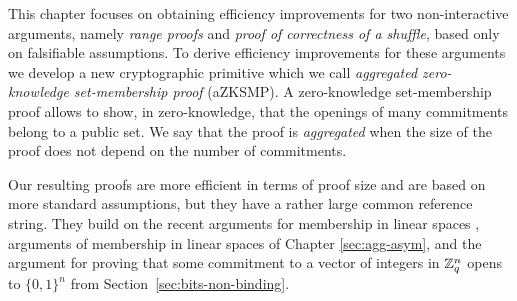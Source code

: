This chapter focuses on obtaining efficiency improvements for two non-interactive arguments, namely \emph{range proofs} and \emph{proof of correctness of a shuffle}, based only on falsifiable assumptions.  To derive efficiency improvements for these arguments we develop a new cryptographic primitive which we call \emph{aggregated zero-knowledge set-membership proof} (aZKSMP). A zero-knowledge set-membership proof allows to show, in zero-knowledge, that the openings of many commitments belong to a public set. We say that the proof is \emph{aggregated} when the size of the proof does not depend on the number of commitments.

Our resulting proofs are more efficient in terms of proof size and are based on more standard assumptions, but they have a rather large common reference string. They build on the recent arguments for membership in linear spaces \cite{EC:LPJY14,C:JutRoy14,EC:KilWee15}, arguments of membership in linear spaces of Chapter \ref{sec:agg-asym}, and the argument for proving that some commitment to a vector of integers in $\mathbb{Z}_q^{n}$ opens to $\{0,1\}^n$ from Section~\ref{sec:bits-non-binding}.
 
